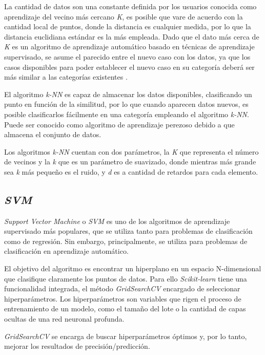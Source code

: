 
La cantidad de datos son una constante definida por los usuarios conocida como aprendizaje del vecino más cercano \textit{K}, es posible que vare de acuerdo con la cantidad local de puntos, donde la distancia es cualquier medida, por lo que la distancia euclidiana estándar es la más empleada. Dado que el dato más cerca de \textit{K} es un algoritmo de aprendizaje automático basado en técnicas de aprendizaje supervisado, se asume el parecido entre el nuevo caso con los datos, ya que los casos disponibles para poder establecer el nuevo caso en su categoría deberá ser más similar a las categorías existentes \cite{JimenezLeon2021}.

El algoritmo \textit{k-NN} es capaz de almacenar los datos disponibles, clasificando un punto en función de la similitud, por lo que cuando aparecen datos nuevos, es posible clasificarlos fácilmente en una categoría empleando el algoritmo \textit{k-NN}. Puede ser conocido como algoritmo de aprendizaje perezoso debido a que almacena el conjunto de datos. 

Los algoritmos \textit{k-NN} cuentan con dos parámetros, la \emph{K} que representa el número de vecinos y la \textit{k} que es un parámetro de suavizado, donde mientras más grande sea \textit{k} más pequeño es el ruido, y \textit{d} es a cantidad de retardos para cada elemento. 

\subsection{\textit{SVM}}

\textit{Support Vector Machine} o \textit{SVM} es uno de los algoritmos de aprendizaje supervisado más populares, que se utiliza tanto para problemas de clasificación como de regresión. Sin embargo, principalmente, se utiliza para problemas de clasificación en aprendizaje automático.

El objetivo del algoritmo es encontrar un hiperplano en un espacio N-dimensional que clasifique claramente los puntos de datos. Para ello \textit{Scikit-learn} tiene una funcionalidad integrada, el método \textit{GridSearchCV} encargado de seleccionar hiperparámetros. Los hiperparámetros son variables que rigen el proceso de entrenamiento de un modelo, como el tamaño del lote o la cantidad de capas ocultas de una red neuronal profunda. 

\textit{GridSearchCV} se encarga de buscar hiperparámetros óptimos y, por lo tanto, mejorar los resultados de precisión/predicción. \cite{BibEntry2022Aug}

